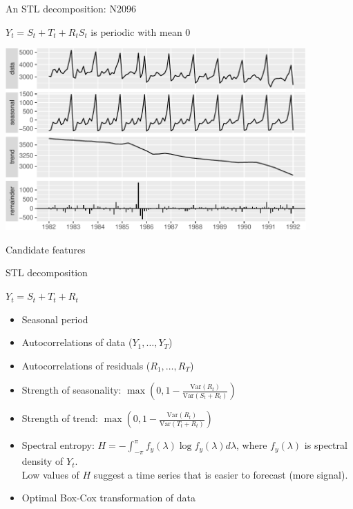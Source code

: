 \documentclass[14pt]{beamer}
\newcommand{\Var}{\text{Var}}
\begin{document}
\begin{frame}{An STL decomposition: N2096}\vspace*{-0.2cm}
\begin{alertblock}{}
\centerline{$Y_t = S_t + T_t + R_t$\qquad $S_{t}$ is periodic with mean 0}
\end{alertblock}\vspace*{0.2cm}
\centerline{\includegraphics[width=11.5cm]{N2096}}
\end{frame}


\begin{frame}{Candidate features}\fontsize{13}{15}\sf
\begin{block}{STL decomposition}
\centerline{$Y_t = S_t + T_t + R_t$}
\end{block}\pause\vspace*{-0.2cm}
\begin{itemize}
\item Seasonal period
\item Autocorrelations of data ($Y_1,\dots,Y_T$)
\item Autocorrelations of residuals ($R_1,\dots,R_T$)
\item Strength of seasonality: $\max\left(0,1 - \frac{\Var(R_t)}{\Var(S_t+R_t)}\right)$
\item Strength of trend:  $\max\left(0,1 - \frac{\Var(R_t)}{\Var(T_t+R_t)}\right)$
\item Spectral entropy: $ H = - \int_{-\pi}^{\pi} f_y(\lambda) \log f_y(\lambda) d\lambda$, where $f_y(\lambda)$ is spectral density of $Y_t$.
\\ Low values of $H$ suggest a time series that is easier to forecast (more signal).
\item Optimal Box-Cox transformation of data
\end{itemize}
\end{frame}
\end{document}
